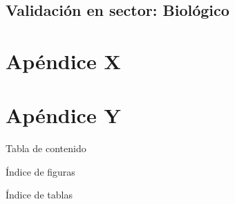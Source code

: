 \documentclass[a4paper,oneside,11pt]{book}
\begin{document}
\section{Validación en sector: Biológico}







\mainmatter  




\label{ch:capituloB} 

\appendix %
\chapter{Apéndice X} 
\label{ch:apendiceX} 


\chapter{Apéndice Y} 
\label{ch:apendiceY} 


\tableofcontents  Tabla de contenido 



\newpage 
\listoffigures  Índice de figuras 
\newpage 
\listoftables  Índice de tablas 
\newpage 



\backmatter 

\end{document}
